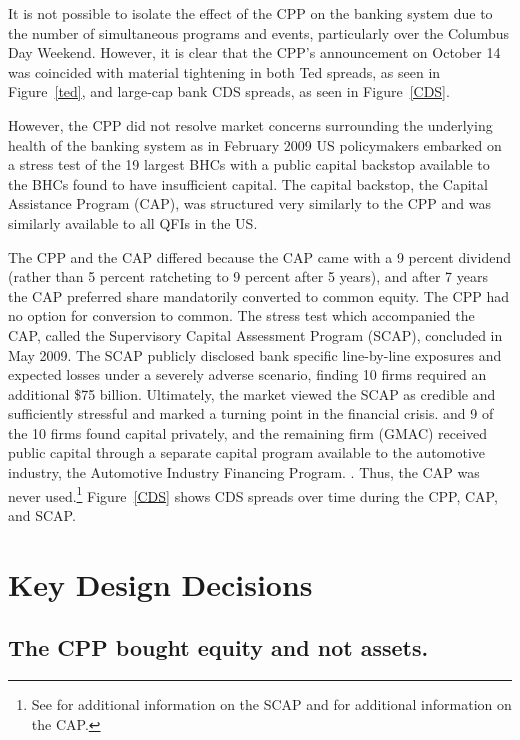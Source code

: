 \documentclass[12pt]{article}
\begin{document}
It is not possible to isolate the effect of the CPP on the banking system due to the number of simultaneous programs and events, particularly over the Columbus Day Weekend. However, it is clear that the CPP's announcement on October 14 was coincided with material tightening in both Ted spreads, as seen in Figure~\ref{ted}, and large-cap bank CDS spreads, as seen in Figure~\ref{CDS}. 

However, the CPP did not resolve market concerns surrounding the underlying health of the banking system as in February 2009 US policymakers embarked on a stress test of the 19 largest BHCs with a public capital backstop available to the BHCs found to have insufficient capital. The capital backstop, the Capital Assistance Program (CAP), was structured very similarly to the CPP and was similarly available to all QFIs in the US. 

The CPP and the CAP differed because the CAP came with a 9 percent dividend (rather than 5 percent ratcheting to 9 percent after 5 years), and after 7 years the CAP preferred share mandatorily converted to common equity. The CPP had no option for conversion to common. The stress test which accompanied the CAP, called the Supervisory Capital Assessment Program (SCAP), concluded in May 2009. The SCAP publicly disclosed bank specific line-by-line exposures and expected losses under a severely adverse scenario, finding 10 firms required an additional \$75 billion. Ultimately, the market viewed the SCAP as credible and sufficiently stressful and marked a turning point in the financial crisis. \citep{Bernanke} and \citep{Geithner} 9 of the 10 firms found capital privately, and the remaining firm (GMAC) received public capital through a separate capital program available to the automotive industry, the Automotive Industry Financing Program. \citep{Ross2016a}. Thus, the CAP was never used.\footnote{See \citet{Ross2016a} for additional information on the SCAP and \citet{Ross2016b} for additional information on the CAP.} Figure~\ref{CDS} shows CDS spreads over time during the CPP, CAP, and SCAP.

\section{Key Design Decisions}

\subsection{The CPP bought equity and not assets.}
\end{document}
